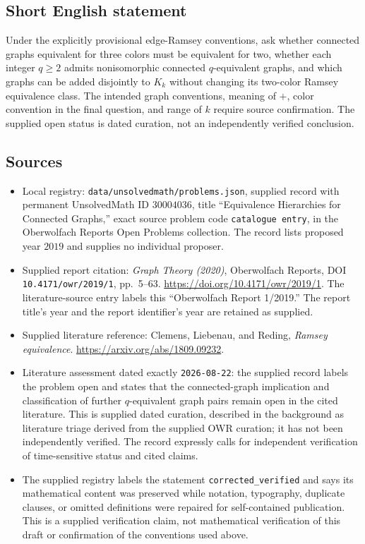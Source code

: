 \documentclass[11pt]{article}
\begin{document}
\subsection{Short English statement}
Under the explicitly provisional edge-Ramsey conventions, ask whether connected graphs equivalent for three colors must be equivalent for two, whether each integer \(q\geq2\) admits nonisomorphic connected \(q\)-equivalent graphs, and which graphs can be added disjointly to \(K_k\) without changing its two-color Ramsey equivalence class. The intended graph conventions, meaning of \(+\), color convention in the final question, and range of \(k\) require source confirmation. The supplied open status is dated curation, not an independently verified conclusion.
\subsection{Sources}
\begin{itemize}
\item Local registry: \texttt{data/unsolvedmath/problems.json}, supplied record with permanent UnsolvedMath ID \(30004036\), title ``Equivalence Hierarchies for Connected Graphs,'' exact source problem code \texttt{catalogue entry}, in the Oberwolfach Reports Open Problems collection. The record lists proposed year \(2019\) and supplies no individual proposer.
\item Supplied report citation: \emph{Graph Theory (2020)}, Oberwolfach Reports, DOI \texttt{10.4171/owr/2019/1}, pp.\ 5--63. \url{https://doi.org/10.4171/owr/2019/1}. The literature-source entry labels this ``Oberwolfach Report 1/2019.'' The report title's year and the report identifier's year are retained as supplied.
\item Supplied literature reference: Clemens, Liebenau, and Reding, \emph{Ramsey equivalence}. \url{https://arxiv.org/abs/1809.09232}.
\item Literature assessment dated exactly \texttt{2026-08-22}: the supplied record labels the problem open and states that the connected-graph implication and classification of further \(q\)-equivalent graph pairs remain open in the cited literature. This is supplied dated curation, described in the background as literature triage derived from the supplied OWR curation; it has not been independently verified. The record expressly calls for independent verification of time-sensitive status and cited claims.
\item The supplied registry labels the statement \texttt{corrected\_verified} and says its mathematical content was preserved while notation, typography, duplicate clauses, or omitted definitions were repaired for self-contained publication. This is a supplied verification claim, not mathematical verification of this draft or confirmation of the conventions used above.
\end{itemize}
\end{document}

